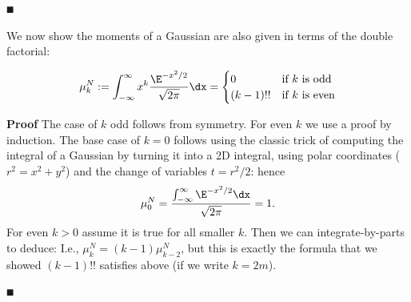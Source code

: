\ensuremath{\QED}

We now show the moments of a Gaussian are also given in terms of the double factorial:

\begin{lemma}
\[
\ensuremath{\mu}_k^N := \ensuremath{\int}_{-\ensuremath{\infty}}^\ensuremath{\infty} x^k {\E^{-x^2/2}  \over \sqrt{2\ensuremath{\pi}}} \dx = \begin{cases}
0 & \hbox{\textrm{if  $k$ is odd}} \\
{(k-1)!!} & \hbox{\textrm{if $k$ is even}}
\end{cases}
\]
\end{lemma}
\textbf{Proof} The case of $k$ odd follows from symmetry. For even $k$ we  use a proof by induction. The base case of $k = 0$ follows using the classic trick of computing the integral of a Gaussian by turning it into a 2D integral, using polar coordinates ($r^2 = x^2 + y^2$) and the change of variables $t = r^2/2$:
hence
\[
\ensuremath{\mu}_0^N = {\ensuremath{\int}_{-\ensuremath{\infty}}^\ensuremath{\infty} \E^{-x^2/2} \dx \over \sqrt{2\ensuremath{\pi}}} = 1.
\]
For even $k> 0$ assume it is true for all smaller $k$. Then we can integrate-by-parts to deduce:
I.e., $\ensuremath{\mu}_k^N = (k-1) \ensuremath{\mu}_{k-2}^N$, but this is exactly the formula that we showed $(k-1)!!$ satisfies above (if we write $k = 2m$).

\ensuremath{\QED}

